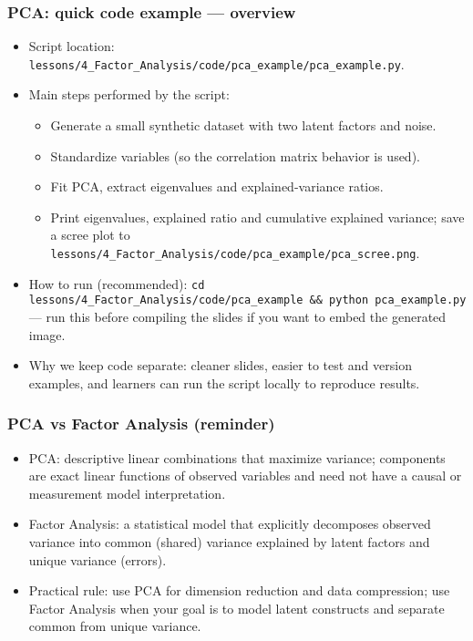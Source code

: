 \documentclass[aspectratio=169]{beamer}
\begin{document}
\begin{frame}
    \frametitle{PCA: quick code example — overview}
    \begin{itemize}
        \item Script location: \texttt{lessons/4\_Factor\_Analysis/code/pca\_example/pca\_example.py}. \pause
        \item Main steps performed by the script: \pause
              \begin{itemize}
                  \item Generate a small synthetic dataset with two latent factors and noise. \pause
                  \item Standardize variables (so the correlation matrix behavior is used). \pause
                  \item Fit PCA, extract eigenvalues and explained-variance ratios. \pause
                  \item Print eigenvalues, explained ratio and cumulative explained variance; save a scree plot to \texttt{lessons/4\_Factor\_Analysis/code/pca\_example/pca\_scree.png}. \pause
              \end{itemize}
        \item How to run (recommended): \texttt{cd lessons/4\_Factor\_Analysis/code/pca\_example \&\& python pca\_example.py} — run this before compiling the slides if you want to embed the generated image. \pause
        \item Why we keep code separate: cleaner slides, easier to test and version examples, and learners can run the script locally to reproduce results.\pause
    \end{itemize}
    \vspace{6pt}
\end{frame}

\begin{frame}
    \frametitle{PCA vs Factor Analysis (reminder)}
    \begin{itemize}
        \item PCA: descriptive linear combinations that maximize variance; components are exact linear functions of observed variables and need not have a causal or measurement model interpretation. \pause
        \item Factor Analysis: a statistical model that explicitly decomposes observed variance into common (shared) variance explained by latent factors and unique variance (errors). \pause
        \item Practical rule: use PCA for dimension reduction and data compression; use Factor Analysis when your goal is to model latent constructs and separate common from unique variance. \pause
    \end{itemize}
\end{frame}
\end{document}

